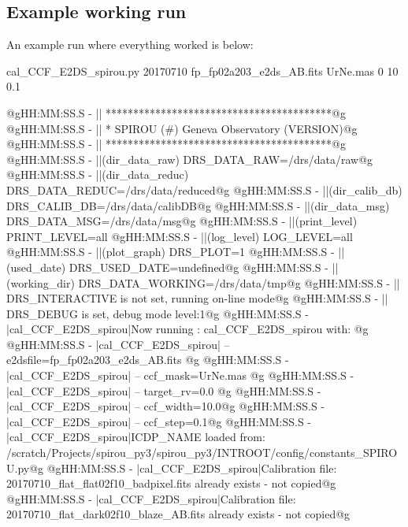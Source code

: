 \newpage
\subsection{Example working run}

An example run where everything worked is below:

\begin{cmdbox}[title={example}]
cal_CCF_E2DS_spirou.py 20170710 fp_fp02a203_e2ds_AB.fits UrNe.mas 0 10 0.1
\end{cmdbox}
\begin{cmdboxprintspecial}[fontupper=\tiny, fontlower=\tiny]
@gHH:MM:SS.S -   || *****************************************@g
@gHH:MM:SS.S -   || * SPIROU \@(#) Geneva Observatory (VERSION)@g
@gHH:MM:SS.S -   || *****************************************@g
@gHH:MM:SS.S -   ||(dir_data_raw)      DRS_DATA_RAW=/drs/data/raw@g
@gHH:MM:SS.S -   ||(dir_data_reduc)    DRS_DATA_REDUC=/drs/data/reduced@g
@gHH:MM:SS.S -   ||(dir_calib_db)      DRS_CALIB_DB=/drs/data/calibDB@g
@gHH:MM:SS.S -   ||(dir_data_msg)      DRS_DATA_MSG=/drs/data/msg@g
@gHH:MM:SS.S -   ||(print_level)       PRINT_LEVEL=all         %
@gHH:MM:SS.S -   ||(log_level)         LOG_LEVEL=all         %
@gHH:MM:SS.S -   ||(plot_graph)        DRS_PLOT=1            %
@gHH:MM:SS.S -   ||(used_date)         DRS_USED_DATE=undefined@g
@gHH:MM:SS.S -   ||(working_dir)       DRS_DATA_WORKING=/drs/data/tmp@g
@gHH:MM:SS.S -   ||                    DRS_INTERACTIVE is not set, running on-line mode@g
@gHH:MM:SS.S -   ||                    DRS_DEBUG is set, debug mode level:1@g
@gHH:MM:SS.S -   |cal_CCF_E2DS_spirou|Now running : cal_CCF_E2DS_spirou with: @g
@gHH:MM:SS.S -   |cal_CCF_E2DS_spirou|       -- e2dsfile=fp_fp02a203_e2ds_AB.fits @g
@gHH:MM:SS.S -   |cal_CCF_E2DS_spirou|       -- ccf_mask=UrNe.mas @g
@gHH:MM:SS.S -   |cal_CCF_E2DS_spirou|       -- target_rv=0.0 @g
@gHH:MM:SS.S -   |cal_CCF_E2DS_spirou|       -- ccf_width=10.0@g
@gHH:MM:SS.S -   |cal_CCF_E2DS_spirou|       -- ccf_step=0.1@g
@gHH:MM:SS.S -   |cal_CCF_E2DS_spirou|ICDP_NAME loaded from: /scratch/Projects/spirou_py3/spirou_py3/INTROOT/config/constants_SPIROU.py@g
@gHH:MM:SS.S -   |cal_CCF_E2DS_spirou|Calibration file: 20170710_flat_flat02f10_badpixel.fits already exists - not copied@g
@gHH:MM:SS.S -   |cal_CCF_E2DS_spirou|Calibration file: 20170710_flat_dark02f10_blaze_AB.fits already exists - not copied@g

\end{cmdboxprintspecial}

